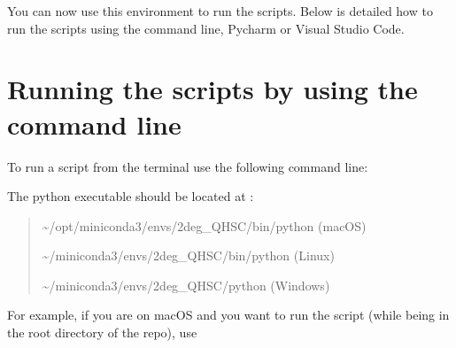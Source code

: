 \documentclass[letterpaper,10pt,english]{sphinxmanual}
\begin{document}
\sphinxAtStartPar
You can now use this environment to run the scripts.
Below is detailed how to run the scripts using the command line,
Pycharm or Visual Studio Code.


\section{Running the scripts by using the command line}
\label{\detokenize{usage:running-the-scripts-by-using-the-command-line}}
\sphinxAtStartPar
To run a script from the terminal use the following command line:

\begin{sphinxVerbatim}[commandchars=\\\{\}]
 
\end{sphinxVerbatim}

\sphinxAtStartPar
The python executable  should be located at :
\begin{quote}

\sphinxAtStartPar
\textasciitilde{}/opt/miniconda3/envs/2deg\_QH\sphinxhyphen{}SC/bin/python (macOS)

\sphinxAtStartPar
\textasciitilde{}/miniconda3/envs/2deg\_QH\sphinxhyphen{}SC/bin/python (Linux)

\sphinxAtStartPar
\textasciitilde{}/miniconda3/envs/2deg\_QH\sphinxhyphen{}SC/python (Windows)
\end{quote}

\sphinxAtStartPar
For example, if you are on macOS and you want to run the script
 (while being in the root directory of the repo), use

\begin{sphinxVerbatim}[commandchars=\\\{\}]
 
\end{sphinxVerbatim}
\end{document}
